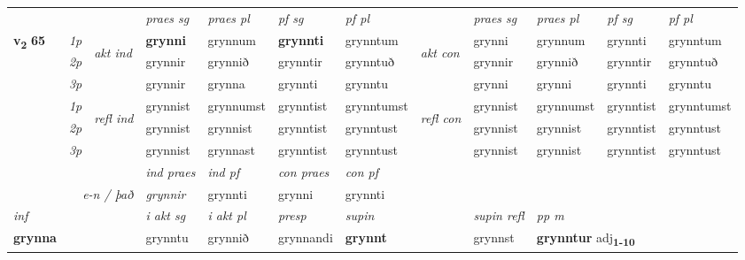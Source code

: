 \begin{longtable}[l]{X>{\footnotesize\itshape}llXXXXlXXXX}
 & &   & \textit{praes sg}  & \textit{praes pl}    & \textit{ pf sg} & \textit{pf pl} & & \textit{praes sg}  & \textit{praes pl}    & \textit{pf sg} & \textit{pf pl }  \\ \cmidrule{4-7} \cmidrule{9-12}
 \multirow{2}{*}{{{\textbf{v{\textsubscript{2}}} \Large{\textbf{65}}}}}  & 1p & \multirow{3}{*}{\begin{turn}{90}\textit{akt ind}\end{turn}} & \textbf{grynni} & grynnum & \textbf{grynnti} & grynntum & \multirow{3}{*}{\begin{turn}{90}\textit{akt con}\end{turn}} &grynni & grynnum & grynnti & grynntum\\*
 & 2p &  &  grynnir  & grynnið & grynntir & grynntuð & & grynnir & grynnið & grynntir & grynntuð \\*
 & 3p &  & grynnir & grynna & grynnti & grynntu & & grynni & grynni& grynnti & grynntu \\*
\cmidrule{4-7} \cmidrule{9-12}
 & 1p & \multirow{3}{*}{\begin{turn}{90}\textit{refl ind}\end{turn}}  & grynnist & grynnumst & grynntist & grynntumst & \multirow{3}{*}{\begin{turn}{90}\textit{refl con}\end{turn}}  &grynnist & grynnumst & grynntist & grynntumst \\*
 & 2p &  & grynnist & grynnist & grynntist & grynntust & &grynnist & grynnist & grynntist & grynntust \\*
 & 3p  & & grynnist & grynnast & grynntist & grynntust & & grynnist & grynnist& grynntist & grynntust \\*
\cmidrule{4-7} \cmidrule{9-12}

   && &  \textit{ind praes} & \textit{ind pf} & \textit{con praes} & \textit{con pf} \\*
\multicolumn{3}{r}{\textit{e-n / það}} & grynnir & grynnti & grynni & grynnti \\*

\cmidrule{4-7}
   {\textit{inf}} & &  & \textit{i akt sg} & \textit{i akt pl}   & \textit{presp} & \textit{supin} && \textit{supin refl} & \textit{pp m} \\*
  {\textbf{grynna}} & && grynntu  & grynnið   & grynnandi &  \textbf{grynnt} && grynnst & \multicolumn{2}{l}{\textbf{grynntur} adj\textbf{\textsubscript{1-10}}} \\*

\midrule


\end{longtable}
